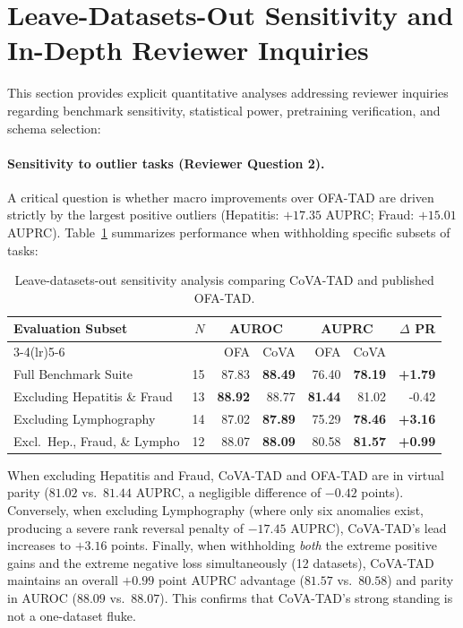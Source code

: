 \documentclass{article}
\begin{document}
\section{Leave-Datasets-Out Sensitivity and In-Depth Reviewer Inquiries}
\label{app:reviewer-inquiries}

This section provides explicit quantitative analyses addressing reviewer inquiries regarding benchmark sensitivity, statistical power, pretraining verification, and schema selection:

\paragraph{Sensitivity to outlier tasks (Reviewer Question 2).}
A critical question is whether macro improvements over OFA-TAD are driven strictly by the largest positive outliers (Hepatitis: $+17.35$ AUPRC; Fraud: $+15.01$ AUPRC). Table~\ref{tab:leave-out} summarizes performance when withholding specific subsets of tasks:
\begin{table}[h]
\centering
\caption{Leave-datasets-out sensitivity analysis comparing CoVA-TAD and published OFA-TAD.}
\label{tab:leave-out}
\small
\setlength{\tabcolsep}{3.8pt}
\begin{tabular}{lrrrrrr}
\toprule
Evaluation Subset & $N$ & \multicolumn{2}{c}{AUROC} & \multicolumn{2}{c}{AUPRC} & $\Delta$ PR \\
\cmidrule(lr){3-4}\cmidrule(lr){5-6}
 & & OFA & CoVA & OFA & CoVA & \\
\midrule
Full Benchmark Suite & 15 & 87.83 & \textbf{88.49} & 76.40 & \textbf{78.19} & \textbf{+1.79} \\
Excluding Hepatitis \& Fraud & 13 & \textbf{88.92} & 88.77 & \textbf{81.44} & 81.02 & -0.42 \\
Excluding Lymphography & 14 & 87.02 & \textbf{87.89} & 75.29 & \textbf{78.46} & \textbf{+3.16} \\
Excl.\ Hep., Fraud, \& Lympho & 12 & 88.07 & \textbf{88.09} & 80.58 & \textbf{81.57} & \textbf{+0.99} \\
\bottomrule
\end{tabular}
\end{table}

When excluding Hepatitis and Fraud, CoVA-TAD and OFA-TAD are in virtual parity ($81.02$ vs.\ $81.44$ AUPRC, a negligible difference of $-0.42$ points). Conversely, when excluding Lymphography (where only six anomalies exist, producing a severe rank reversal penalty of $-17.45$ AUPRC), CoVA-TAD's lead increases to $+3.16$ points. Finally, when withholding \emph{both} the extreme positive gains and the extreme negative loss simultaneously (12 datasets), CoVA-TAD maintains an overall $+0.99$ point AUPRC advantage ($81.57$ vs.\ $80.58$) and parity in AUROC ($88.09$ vs.\ $88.07$). This confirms that CoVA-TAD's strong standing is not a one-dataset fluke.
\end{document}
